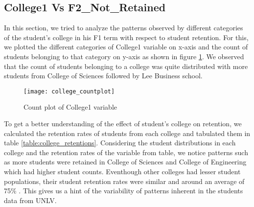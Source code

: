 \documentclass[11pt,openright]{report}
\begin{document}
\subsection {College1 Vs F2\_Not\_Retained}
In this section, we tried to analyze the patterns observed by different categories of the student's college in his F1 term with respect to student retention. For this, we plotted the different categories of College1 variable on x-axis and the count of students belonging to that category on y-axis as shown in figure \ref{fig:college_F2NotRetained_plot}. We observed that the count of students belonging to a college was quite distributed with more students from College of Sciences followed by Lee Business school.

\begin{figure}[!ht]
	\centering
	\texttt{[image: college\_countplot]}
	\caption{Count plot of College1 variable}
	\label{fig:college_F2NotRetained_plot}
\end{figure}

To get a better understanding of the effect of student's college on retention, we calculated the retention rates of students from each college and tabulated them in table  \ref{table:college_retentions}. Considering the student distributions in each college and the retention rates of the variable from table, we notice patterns such as more students were retained in College of Sciences and College of Engineering which had higher student counts. Eventhough other colleges had lesser student populations, their student retention rates were similar and around an average of 75\% . This gives us a hint of the variability of patterns inherent in the students data from UNLV.
\end{document}
